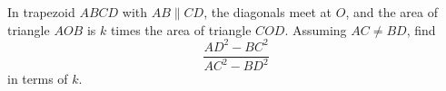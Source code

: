 In trapezoid $ABCD$ with $AB\parallel CD$, the diagonals meet at $O$, and the area of triangle $AOB$ is $k$ times the area of triangle $COD$. Assuming $AC\ne BD$, find
\[
\dfrac{AD^2-BC^2}{AC^2-BD^2}
\]
in terms of $k$.
